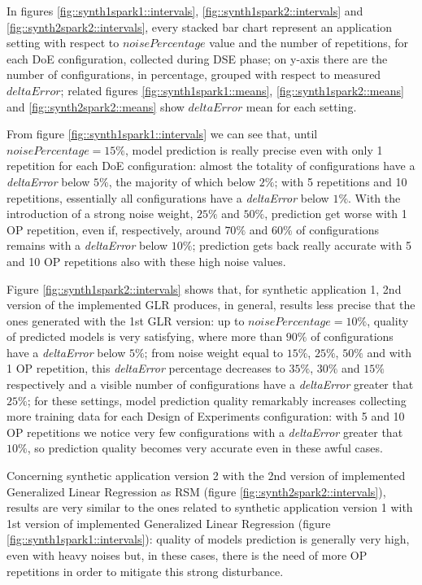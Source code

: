 In figures \ref{fig::synth1spark1::intervals}, \ref{fig::synth1spark2::intervals} and \ref{fig::synth2spark2::intervals}, every stacked bar chart represent an application setting with respect to $noisePercentage$ value and the number of repetitions, for each DoE configuration, collected during DSE phase; on y-axis there are the number of configurations, in percentage, grouped with respect to measured $deltaError$; related figures \ref{fig::synth1spark1::means}, \ref{fig::synth1spark2::means} and \ref{fig::synth2spark2::means} show $deltaError$ mean for each setting.

From figure \ref{fig::synth1spark1::intervals} we can see that, until $noisePercentage = 15\%$, model prediction is really precise even with only 1 repetition for each DoE configuration: almost the totality of configurations have a \textit{deltaError} below $5\%$, the majority of which below $2\%$; with 5 repetitions and 10 repetitions, essentially all configurations have a \textit{deltaError} below $1\%$. With the introduction of a strong noise weight, $25\%$ and $50\%$, prediction get worse with 1 OP repetition, even if, respectively, around $70\%$ and $60\%$ of configurations remains with a \textit{deltaError} below $10\%$; prediction gets back really accurate with 5 and 10 OP repetitions also with these high noise values.

Figure \ref{fig::synth1spark2::intervals} shows that, for synthetic application 1, 2nd version of the implemented GLR produces, in general, results less precise that the ones generated with the 1st GLR version: up to $noisePercentage = 10\%$, quality of predicted models is very satisfying, where more than $90\%$ of configurations have a \textit{deltaError} below $5\%$; from noise weight equal to $15\%$, $25\%$, $50\%$ and with 1 OP repetition, this \textit{deltaError} percentage decreases to $35\%$, $30\%$ and $15\%$ respectively and a visible number of configurations have a \textit{deltaError} greater that $25\%$; for these settings, model prediction quality remarkably increases collecting more training data for each Design of Experiments configuration: with 5 and 10 OP repetitions we notice very few configurations with a \textit{deltaError} greater that $10\%$, so prediction quality becomes very accurate even in these awful cases.

Concerning synthetic application version 2 with the 2nd version of implemented Generalized Linear Regression as RSM (figure \ref{fig::synth2spark2::intervals}), results are very similar to the ones related to synthetic application version 1 with 1st version of implemented Generalized Linear Regression (figure \ref{fig::synth1spark1::intervals}): quality of models prediction is generally very high, even with heavy noises but, in these cases, there is the need of more OP repetitions in order to mitigate this strong disturbance.

